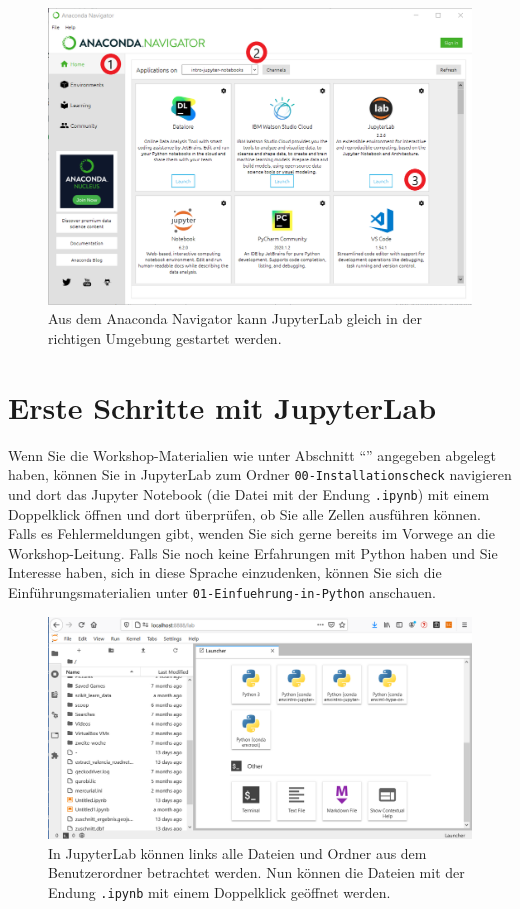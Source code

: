 \documentclass{tufte-handout}
\begin{document}
\begin{figure}[h]
  \includegraphics{anaconda-navigator-jupyterlab--mit-reihenfolge}
  \caption{Aus dem Anaconda Navigator kann JupyterLab gleich in der richtigen Umgebung gestartet werden.}%
\label{fig:start-jupyterlab}
\end{figure}

\section{Erste Schritte mit JupyterLab}

Wenn Sie die Workshop-Materialien wie unter Abschnitt \enquote{} angegeben  abgelegt haben, 
können Sie in JupyterLab zum Ordner 
\texttt{00-Installationscheck}
navigieren und dort das Jupyter Notebook (die Datei mit der Endung \texttt{.ipynb}) mit einem Doppelklick öffnen
und dort überprüfen, ob Sie alle Zellen ausführen können.
Falls es Fehlermeldungen gibt, wenden Sie sich gerne bereits im Vorwege an die Workshop-Leitung.
Falls Sie noch keine Erfahrungen mit Python haben und Sie Interesse haben, sich in diese Sprache einzudenken,
können Sie sich die Einführungsmaterialien unter
\texttt{01-Einfuehrung-in-Python}
anschauen.

\begin{figure}[h]
  \includegraphics{jupyterlab-running}
  \caption{In JupyterLab können links alle Dateien und Ordner aus dem Benutzerordner betrachtet werden.
  Nun können die Dateien mit der Endung \texttt{.ipynb} mit einem Doppelklick geöffnet werden.
  }%
\label{fig:jupyterlab-running}
\end{figure}
\end{document}
